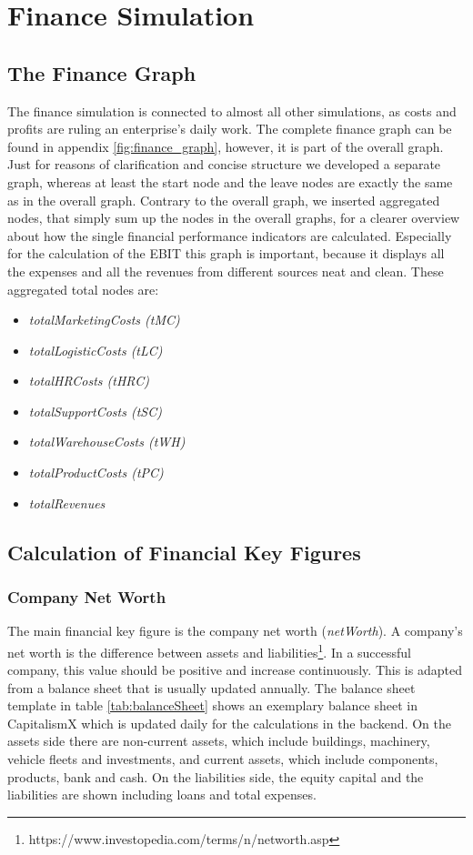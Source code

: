 \section{Finance Simulation}
\label{sec:finance_simulation}

\subsection{The Finance Graph}
The finance simulation is connected to almost all other simulations, as costs and profits are ruling an enterprise's daily work. The complete finance graph can be found in appendix \ref{fig:finance_graph}, however, it is part of the overall graph. Just for reasons of clarification and concise structure we developed a separate graph, whereas at least the start node and the leave nodes are exactly the same as in the overall graph. Contrary to the overall graph, we inserted aggregated nodes, that simply sum up the nodes in the overall graphs, for a clearer overview about how the single financial performance indicators are calculated. Especially for the calculation of the \gls{EBIT} this graph is important, because it displays all the expenses and all the revenues from different sources neat and clean. These aggregated total nodes are:
\begin{itemize}
    \item \textit{totalMarketingCosts (tMC)}
    \item \textit{totalLogisticCosts (tLC)}
    \item \textit{totalHRCosts (tHRC)}
    \item \textit{totalSupportCosts (tSC)}
    \item \textit{totalWarehouseCosts (tWH)}
    \item \textit{totalProductCosts (tPC)}
    \item \textit{totalRevenues}
\end{itemize}

\subsection{Calculation of Financial Key Figures}
\subsubsection{Company Net Worth}
The main financial key figure is the company net worth (\textit{netWorth}). A company's net worth is the difference between assets and liabilities\footnote{https://www.investopedia.com/terms/n/networth.asp}. In a successful company, this value should be positive and increase continuously. This is adapted from a balance sheet that is usually updated annually. The balance sheet template in table \ref{tab:balanceSheet} shows an exemplary balance sheet in CapitalismX which is updated daily for the calculations in the backend. On the assets side there are non-current assets, which include buildings, machinery, vehicle fleets and investments, and current assets, which include components, products, bank and cash. On the liabilities side, the equity capital and the liabilities are shown including loans and total expenses.

